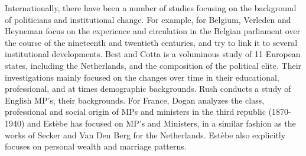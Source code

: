     Internationally, there have been a number of studies focusing on the background of politicians and institutional change. For example, for Belgium, Verleden and Heyneman focus on the experience and circulation in the Belgian parliament over the course of the nineteenth and twentieth centuries, and try to link it to several institutional developments.\autocite{verleden2008parlementaire} Best and Cotta is a voluminous study of 11 European states, including the Netherlands, and the composition of the political elite.\autocite{best2000parliamentary} Their investigations mainly focused on the changes over time in their educational, professional, and at times demographic backgrounds. Rush conducts a study of English MP’s, their backgrounds.\autocite{rush2001role} %
    For France, Dogan analyzes the class, professional and social origin of MPs and ministers in the third republic (1870-1940) and Estèbe has focused on MP’s and Ministers, in a similar fashion as the works of Secker and Van Den Berg for the Netherlands.\autocite{dogan1967filieres, estebe1982ministres} Estèbe also explicitly focuses on personal wealth and marriage patterns. 

    
